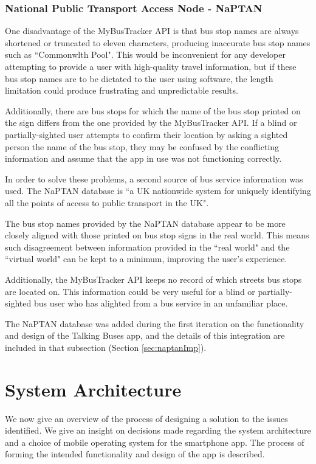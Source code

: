 \documentclass[10pt,twocolumn]{article}
\begin{document}
\subsubsection{National Public Transport Access Node - NaPTAN}
\label{sec:myBusTrackerLimitations}
One disadvantage of the MyBusTracker API is that bus stop names are always shortened or truncated to eleven characters, producing inaccurate bus stop names such as ``Commonwlth Pool". This would be inconvenient for any developer attempting to provide a user with high-quality travel information, but if these bus stop names are to be dictated to the user using software, the length limitation could produce frustrating and unpredictable results.

Additionally, there are bus stops for which the name of the bus stop printed on the sign differs from the one provided by the MyBusTracker API. If a blind or partially-sighted user attempts to confirm their location by asking a sighted person the name of the bus stop, they may be confused by the conflicting information and assume that the app in use was not functioning correctly.

In order to solve these problems, a second source of bus service information was used. The NaPTAN database is ``a UK nationwide system for uniquely identifying all the points of access to public transport in the UK".

The bus stop names provided by the NaPTAN database appear to be more closely aligned with those printed on bus stop signs in the real world. This means such disagreement between information provided in the ``real world" and the ``virtual world" can be kept to a minimum, improving the user's experience.

Additionally, the MyBusTracker API keeps no record of which streets bus stops are located on. This information could be very useful for a blind or partially-sighted bus user who has alighted from a bus service in an unfamiliar place.

The NaPTAN database was added during the first iteration on the functionality and design of the Talking Buses app, and the details of this integration are included in that subsection (Section \ref{sec:naptanImp}).


\section{System Architecture}
We now give an overview of the process of designing a solution to the issues identified. We give an insight on decisions made regarding the system architecture and a choice of mobile operating system for the smartphone app.  The process of forming the intended functionality and design of the app is described.
\end{document}
